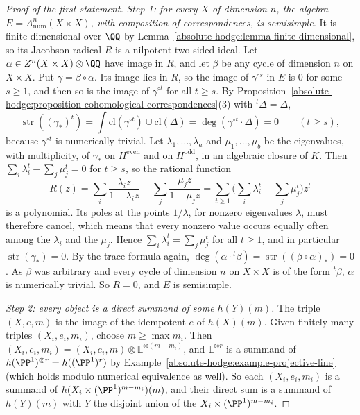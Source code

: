 \begin{proof}[Proof of the first statement]
\emph{Step 1: for every $X$ of dimension $n$, the algebra $E = A^n_{\mathrm{num}}(X \times X)$, with composition of correspondences, is semisimple.} It is finite-dimensional over $\QQ$ by
Lemma~\ref{absolute-hodge:lemma-finite-dimensional}, so its Jacobson radical $R$ is a nilpotent two-sided ideal. Let $\alpha \in Z^n(X \times X) \otimes \QQ$ have image in $R$, and let $\beta$ be any cycle of
dimension $n$ on $X \times X$. Put $\gamma = \beta \circ \alpha$. Its image lies in $R$, so the image of $\gamma^{\circ s}$ in $E$ is $0$ for some $s \geq 1$, and then so is the image of $\gamma^{\circ t}$ for all $t \geq s$.
By Proposition~\ref{absolute-hodge:proposition-cohomological-correspondences}(3) with ${}^t\Delta = \Delta$,
\[
\operatorname{str}((\gamma_*)^t) = \int\mathrm{cl}(\gamma^{\circ t}) \cup \mathrm{cl}(\Delta) = \deg(\gamma^{\circ t} \cdot \Delta) = 0 \qquad (t \geq s),
\]
because $\gamma^{\circ t}$ is numerically trivial. Let $\lambda_1, \ldots, \lambda_a$ and $\mu_1, \ldots, \mu_b$ be the eigenvalues, with multiplicity, of $\gamma_*$ on $H^{\mathrm{even}}$ and on $H^{\mathrm{odd}}$, in an algebraic closure of $K$.
Then $\sum_i\lambda_i^t - \sum_j\mu_j^t = 0$ for $t \geq s$, so the rational function
\[
R(z) = \sum_i\frac{\lambda_iz}{1 - \lambda_iz} - \sum_j\frac{\mu_jz}{1 - \mu_jz} = \sum_{t \geq 1}\Big(\sum_i\lambda_i^t - \sum_j\mu_j^t\Big)z^t
\]
is a polynomial. Its poles at the points $1/\lambda$, for nonzero eigenvalues $\lambda$, must therefore cancel, which means that every nonzero value occurs equally often among the $\lambda_i$ and the $\mu_j$. Hence
$\sum_i\lambda_i^t = \sum_j\mu_j^t$ for all $t \geq 1$, and in particular $\operatorname{str}(\gamma_*) = 0$. By the trace formula again, $\deg(\alpha \cdot {}^t\beta) = \operatorname{str}((\beta \circ \alpha)_*) = 0$. As
$\beta$ was arbitrary and every cycle of dimension $n$ on $X \times X$ is of the form ${}^t\beta$, $\alpha$ is numerically trivial. So $R = 0$, and $E$ is semisimple.

\emph{Step 2: every object is a direct summand of some $h(Y)(m)$.} The triple $(X, e, m)$ is the image of the idempotent $e$ of $h(X)(m)$. Given finitely many triples $(X_i, e_i, m_i)$, choose $m \geq \max m_i$. Then
$(X_i, e_i, m_i) = (X_i, e_i, m) \otimes \mathbb{L}^{\otimes(m - m_i)}$, and $\mathbb{L}^{\otimes r}$ is a summand of $h(\PP^1)^{\otimes r} = h((\PP^1)^r)$ by Example~\ref{absolute-hodge:example-projective-line} (which
holds modulo numerical equivalence as well). So each $(X_i, e_i, m_i)$ is a summand of $h(X_i \times (\PP^1)^{m-m_i})(m)$, and their direct sum is a summand of $h(Y)(m)$ with $Y$ the disjoint union of the
$X_i \times (\PP^1)^{m-m_i}$.


\end{proof}
